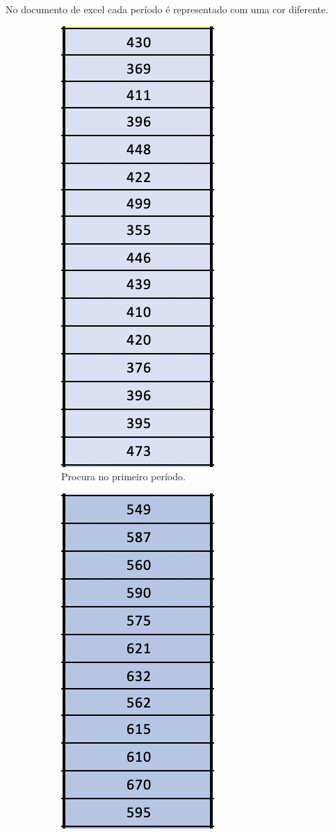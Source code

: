 \documentclass[a4paper]{article}
\begin{document}
No documento de excel cada período é representado com uma cor diferente.

\begin{figure}[H]
  \centering
  \begin{subfigure}[b]{0.3\linewidth}
    \includegraphics[scale = 0.6]{procura_p1.png}
    \caption{Procura no primeiro período.}
  \end{subfigure}
  \begin{subfigure}[b]{0.3\linewidth}
    \includegraphics[scale=0.6]{procura_p2.png}

\end{subfigure}
\end{figure}
\end{document}
